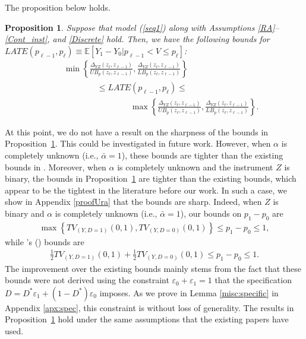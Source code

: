 \documentclass[11pt,reqno]{amsart}
\theoremstyle{plain}
\newtheorem{proposition}{Proposition}
\numberwithin{equation}{section}
\begin{document}
The proposition below holds.
\begin{proposition}\label{propdiscrete}
Suppose that model (\ref{seq1}) along with Assumptions \ref{RA}--\ref{Cont_inst}, and \ref{Discrete} hold. Then, we have the following bounds for $LATE(p_{\ell-1},p_{\ell})\equiv\mathbb E\left[Y_1-Y_0 \vert p_{\ell-1}<V\leq p_{\ell}\right]$:
\begin{eqnarray}
&& \min\left\{\frac{\Delta_{YZ}(z_\ell,z_{\ell-1})}{UB_p(z_\ell,z_{\ell-1})}, \frac{\Delta_{YZ}(z_\ell,z_{\ell-1})}{LB_p(z_\ell,z_{\ell-1})}\right\} \nonumber\\
&& \qquad \qquad \leq LATE(p_{\ell-1},p_{\ell})\leq \\
&& \qquad \qquad \qquad \qquad \max\left\{\frac{\Delta_{YZ}(z_\ell,z_{\ell-1})}{UB_p(z_\ell,z_{\ell-1})}, \frac{\Delta_{YZ}(z_\ell,z_{\ell-1})}{LB_p(z_\ell,z_{\ell-1})}\right\}. \nonumber
\end{eqnarray}
\end{proposition}
At this point, we do not have a result on the sharpness of the bounds in Proposition~\ref{propdiscrete}. This could be investigated in future work. However, when $\alpha$ is completely unknown (i.e., $\bar{\alpha}=1$), these bounds are tighter than the existing bounds in \cite{Tommasi2020}. Moreover, when $\alpha$ is completely unknown and the instrument $Z$ is binary, the bounds in Proposition~\ref{propdiscrete} are tighter than the existing \cite{Ura2018} bounds, which appear to be the tightest in the literature before our work. In such a case, we show in Appendix \ref{proofUra} that the bounds are sharp. Indeed, when $Z$ is binary and $\alpha$ is completely unknown (i.e., $\bar{\alpha}=1$), our bounds on $p_1-p_0$ are
\begin{eqnarray*}
\max\left\{TV_{(Y,D=1)}(0,1), TV_{(Y,D=0)}(0,1)\right\} \leq p_1-p_0 \leq 1,
\end{eqnarray*}
while \citeauthor{Ura2018}'s (\citeyear{Ura2018}) bounds are
\begin{eqnarray*}
\frac{1}{2} TV_{(Y,D=1)}(0,1) + \frac{1}{2} TV_{(Y,D=0)}(0,1) \leq p_1-p_0 \leq 1.
\end{eqnarray*}
The improvement over the existing bounds mainly stems from the fact that these bounds were not derived using the constraint $\varepsilon_0+\varepsilon_1=1$ that the specification $D=D^* \varepsilon_1 +(1-D^*)\varepsilon_0$ imposes. As we prove in Lemma \ref{misc:specific} in Appendix \ref{apx:spec}, this constraint is without loss of generality. The results in Proposition~\ref{propdiscrete} hold under the same assumptions that the existing papers have used.   
\end{document}
